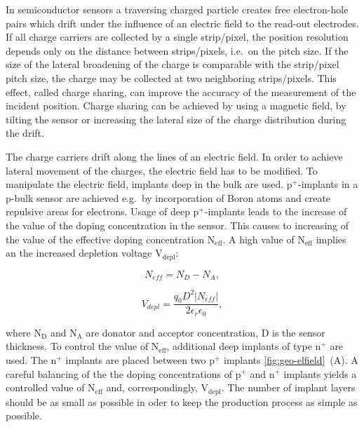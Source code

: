 
In semiconductor sensors a traversing charged particle creates free electron-hole pairs which drift under the influence of an electric field to the read-out electrodes. 
If all charge carriers are collected by a single strip/pixel, the position resolution depends only on the distance between strips/pixels, i.e.\ on the pitch size. 
If the size of the lateral broadening of the charge is comparable with the strip/pixel pitch size, the charge may be collected at two neighboring strips/pixels. %
This effect, called charge sharing, can improve the accuracy of the measurement of the incident position. 
Charge sharing can be achieved by using a magnetic field, by tilting the sensor or increasing the lateral size of the charge distribution during the drift.

The charge carriers drift along the lines of an electric field. 
In order to achieve lateral movement of the charges, the electric field has to be modified. 
To manipulate the electric field, implants deep in the bulk are used. 
p$^{\textrm{+}}$-implants in a p-bulk sensor are achieved e.g.\ by incorporation of Boron atoms and create repulsive areas for electrons. 
Usage of deep p$^{\textrm{+}}$-implants leads to the increase of the value of the doping concentration in the sensor. 
This causes to increasing of the value of the effective doping concentration N$_{\textrm{eff}}$.
A high value of N$_{\textrm{eff}}$ implies an the increased depletion voltage V$_{\textrm{depl}}$:

\begin{equation}
 N_{eff}=N_{D}-N_{A} ,
\end{equation}

\begin{equation}
 V_{depl}=\frac{q_0 D^2 |N_{eff}|}{2 \epsilon_r \epsilon_0 } ,
\end{equation}

\noindent where N$_{\textrm{D}}$ and N$_{\textrm{A}}$ are donator and acceptor concentration, D is the sensor thickness.
To control the value of N$_{\textrm{eff}}$, additional deep implants of type n$^{\textrm{+}}$ are used. 
The n$^{\textrm{+}}$ implants are placed between two p$^{\textrm{+}}$ implants \ref{fig:geo-elfield}~(A). %
A careful balancing of the the doping concentrations of p$^{\textrm{+}}$ and n$^{\textrm{+}}$ implants yields a controlled value of N$_{\textrm{eff}}$ and, correspondingly, V$_{\textrm{depl}}$. 
The number of implant layers should be as small as possible in oder to keep the production process as simple as possible. 

